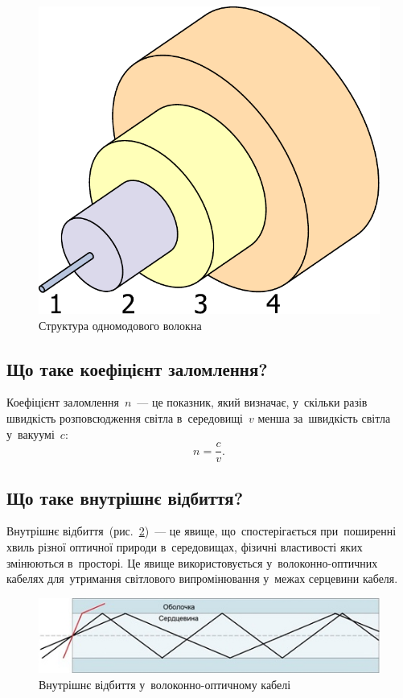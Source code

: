 \documentclass[
	a4paper,
	oneside,
	BCOR = 10mm,
	DIV = 12,
	12pt,
	headings = normal,
]{scrartcl}
\begin{document}
			\begin{figure}[!htbp]
				\centering
				\def\svgwidth{\columnwidth}
				\includegraphics[height = 5\baselineskip]{./assets/single-mode-fiber-structure.pdf}
				\caption{Структура одномодового волокна}
				\label{fig:single-mode-fiber-structure}
			\end{figure}

		\subsection{Що таке коефіцієнт заломлення?}
			Коефіцієнт заломлення~$n$~— це показник, який визначає, у~скільки разів швидкість розповсюдження світла в~середовищі~$v$ менша за~швидкість світла у~вакуумі~$c$:
			\[
				n = \frac{c}{v}.
			\]

		\subsection{Що таке внутрішнє відбиття?}
			Внутрішнє відбиття~(рис.~\ref{fig:internal-reflection-fiber-optical-cable})~— це явище, що~спостерігається при~поширенні хвиль різної оптичної природи в~середовищах, фізичні властивості яких змінюються в~просторі. Це явище використовується у~волоконно-оптичних кабелях для~утримання світлового випромінювання у~межах серцевини кабеля.

			\begin{figure}[!htbp]
				\centering
				\includegraphics[height = 4\baselineskip]{./assets/total-internal-reflection.jpg}
				\caption{Внутрішнє відбиття у~волоконно-оптичному кабелі}
				\label{fig:internal-reflection-fiber-optical-cable}
			\end{figure}
\end{document}
